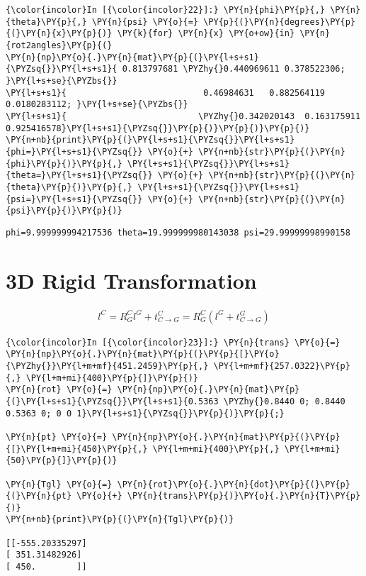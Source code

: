 \documentclass[a4paper]{scrreprt}
\begin{document}
\begin{Verbatim}[commandchars=\\\{\}]
{\color{incolor}In [{\color{incolor}22}]:} \PY{n}{phi}\PY{p}{,} \PY{n}{theta}\PY{p}{,} \PY{n}{psi} \PY{o}{=} \PY{p}{(}\PY{n}{degrees}\PY{p}{(}\PY{n}{x}\PY{p}{)} \PY{k}{for} \PY{n}{x} \PY{o+ow}{in} \PY{n}{rot2angles}\PY{p}{(}
\PY{n}{np}\PY{o}{.}\PY{n}{mat}\PY{p}{(}\PY{l+s+s1}{\PYZsq{}}\PY{l+s+s1}{ 0.813797681 \PYZhy{}0.440969611 0.378522306;  }\PY{l+s+se}{\PYZbs{}}
\PY{l+s+s1}{                           0.46984631   0.882564119 0.0180283112; }\PY{l+s+se}{\PYZbs{}}
\PY{l+s+s1}{                          \PYZhy{}0.342020143  0.163175911 0.925416578}\PY{l+s+s1}{\PYZsq{}}\PY{p}{)}\PY{p}{)}\PY{p}{)}
\PY{n+nb}{print}\PY{p}{(}\PY{l+s+s1}{\PYZsq{}}\PY{l+s+s1}{phi=}\PY{l+s+s1}{\PYZsq{}} \PY{o}{+} \PY{n+nb}{str}\PY{p}{(}\PY{n}{phi}\PY{p}{)}\PY{p}{,} \PY{l+s+s1}{\PYZsq{}}\PY{l+s+s1}{theta=}\PY{l+s+s1}{\PYZsq{}} \PY{o}{+} \PY{n+nb}{str}\PY{p}{(}\PY{n}{theta}\PY{p}{)}\PY{p}{,} \PY{l+s+s1}{\PYZsq{}}\PY{l+s+s1}{psi=}\PY{l+s+s1}{\PYZsq{}} \PY{o}{+} \PY{n+nb}{str}\PY{p}{(}\PY{n}{psi}\PY{p}{)}\PY{p}{)}
\end{Verbatim}


\begin{Verbatim}[commandchars=\\\{\}]
phi=9.999999994217536 theta=19.999999980143038 psi=29.99999998990158

\end{Verbatim}

\section{3D Rigid Transformation}\label{d-rigid-transformation}
\begin{gather}
	l^C = R_G^C l^G + t^C_{C\to G} = R_G^C (l^G + t^G_{C\to G})
\end{gather}


\begin{Verbatim}[commandchars=\\\{\},samepage=true]
{\color{incolor}In [{\color{incolor}23}]:} \PY{n}{trans} \PY{o}{=} \PY{n}{np}\PY{o}{.}\PY{n}{mat}\PY{p}{(}\PY{p}{[}\PY{o}{\PYZhy{}}\PY{l+m+mf}{451.2459}\PY{p}{,} \PY{l+m+mf}{257.0322}\PY{p}{,} \PY{l+m+mi}{400}\PY{p}{]}\PY{p}{)}
\PY{n}{rot} \PY{o}{=} \PY{n}{np}\PY{o}{.}\PY{n}{mat}\PY{p}{(}\PY{l+s+s1}{\PYZsq{}}\PY{l+s+s1}{0.5363 \PYZhy{}0.8440 0; 0.8440 0.5363 0; 0 0 1}\PY{l+s+s1}{\PYZsq{}}\PY{p}{)}\PY{p}{;} 

\PY{n}{pt} \PY{o}{=} \PY{n}{np}\PY{o}{.}\PY{n}{mat}\PY{p}{(}\PY{p}{[}\PY{l+m+mi}{450}\PY{p}{,} \PY{l+m+mi}{400}\PY{p}{,} \PY{l+m+mi}{50}\PY{p}{]}\PY{p}{)}

\PY{n}{Tgl} \PY{o}{=} \PY{n}{rot}\PY{o}{.}\PY{n}{dot}\PY{p}{(}\PY{p}{(}\PY{n}{pt} \PY{o}{+} \PY{n}{trans}\PY{p}{)}\PY{o}{.}\PY{n}{T}\PY{p}{)}
\PY{n+nb}{print}\PY{p}{(}\PY{n}{Tgl}\PY{p}{)}

[[-555.20335297]
[ 351.31482926]
[ 450.        ]]

\end{Verbatim}
\end{document}
